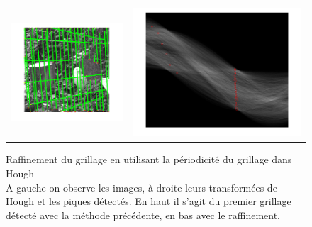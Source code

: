 \begin{figure}[h]
\begin{center}
\begin{tabular}{cc}
\includegraphics[scale=0.3]{fig/grillageavecraf.png}
& \includegraphics[scale=0.2]{fig/houghavecraf.png}
\end{tabular}

\caption{\label{grillage2} Raffinement du grillage en utilisant la périodicité du grillage dans Hough\\
A gauche on observe les images, à droite leurs transformées de Hough et les piques détectés. En haut il s'agit du premier grillage détecté avec la méthode précédente, en bas avec le raffinement.}
\end{center}
\end{figure}




